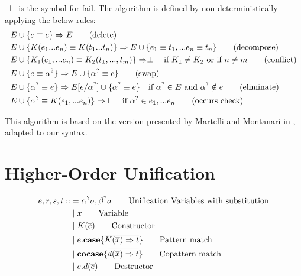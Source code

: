 \documentclass[twoside,12pt,a4paper]{article}
\begin{document}
\begin{definition}
    $\perp$ is the symbol for fail.
    The algorithm is defined by non-deterministically applying the below rules:
    \begin{align*}
        E & \cup \{ e \equiv e\} \Rightarrow E \tag{delete}\\
        E & \cup \{K(e_1 ... e_n) \equiv K(t_1 ... t_n)\} \Rightarrow E \cup \{e_1 \equiv t_1, ... e_n \equiv t_n\}\tag{decompose}\\
        E & \cup \{K_1(e_1,...e_n) \equiv K_2(t_1, ..., t_m)\}  \Rightarrow \perp \quad\text{if $K_1 \neq K_2$ or if $n\neq m$} \tag{conflict}\\
        E & \cup \{e \equiv \alpha^?\} \Rightarrow E \cup \{\alpha^? \equiv e\}\tag{swap}\\ 
        E & \cup \{\alpha^? \equiv e\} \Rightarrow E[e/\alpha^?] \cup \{\alpha^? \equiv e\} \quad\text{if $\alpha^? \in E$ and $\alpha^? \notin e$}  \tag{eliminate}\\
        E & \cup \{\alpha^? \equiv K(e_1,...e_n)\}\Rightarrow \perp \quad \text{if $\alpha^? \in e_1,...e_n$} \tag{occurs check} \label{a}
    \end{align*}
\end{definition}

This algorithm is based on the version presented by Martelli and Montanari in \cite{10.1145/357162.357169},
adapted to our syntax.

\section{Higher-Order Unification}

\begin{definition}
    \begin{align*}
        e,r,s,t  ::&= \alphaunifvar\sigma, \betaunifvar\sigma \tag*{Unification Variables with substitution}\\ %
            &\partition x  \tag*{Variable} \\
            &\partition\constructor \tag*{Constructor} \\
            &\partition\patmatch  \tag*{Pattern match}\\
            &\partition\copatmatch  \tag*{Copattern match}\\
            &\partition\destructor  \tag*{Destructor}
    \end{align*}
\end{definition}
\end{document}
